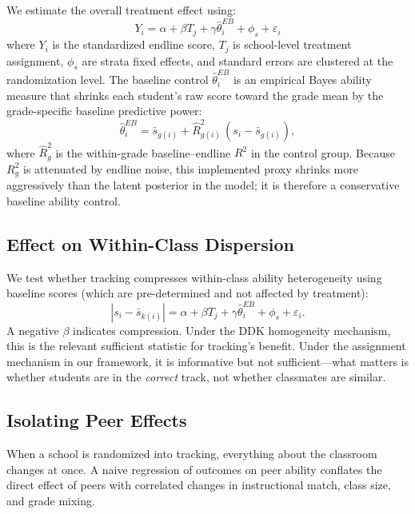 \documentclass[11pt]{article}
\begin{document}
We estimate the overall treatment effect using:
\begin{equation}
\label{eq:itt}
Y_i = \alpha + \beta T_j + \gamma \hat{\theta}^{EB}_i + \phi_s + \varepsilon_i
\end{equation}
where $Y_i$ is the standardized endline score, $T_j$ is school-level treatment assignment, $\phi_s$ are strata fixed effects, and standard errors are clustered at the randomization level. The baseline control $\hat{\theta}^{EB}_i$ is an empirical Bayes ability measure that shrinks each student's raw score toward the grade mean by the grade-specific baseline predictive power:
\begin{equation}
\label{eq:eb}
\hat{\theta}^{EB}_{i} = \bar{s}_{g(i)} + \widehat{R}^2_{g(i)}\,(s_i - \bar{s}_{g(i)}),
\end{equation}
where $\widehat{R}^2_g$ is the within-grade baseline--endline $R^2$ in the control group. Because $R^2_g$ is attenuated by endline noise, this implemented proxy shrinks more aggressively than the latent posterior in the model; it is therefore a conservative baseline ability control.

\subsection{Effect on Within-Class Dispersion}

We test whether tracking compresses within-class ability heterogeneity using baseline scores (which are pre-determined and not affected by treatment):
\begin{equation}
|s_i - \bar{s}_{k(i)}| = \alpha + \beta T_j + \gamma \hat{\theta}^{EB}_i + \phi_s + \varepsilon_i.
\end{equation}
A negative $\beta$ indicates compression. Under the DDK homogeneity mechanism, this is the relevant sufficient statistic for tracking's benefit. Under the assignment mechanism in our framework, it is informative but not sufficient---what matters is whether students are in the \emph{correct} track, not whether classmates are similar.

\subsection{Isolating Peer Effects}
\label{sec:bh}

When a school is randomized into tracking, everything about the classroom changes at once. A naive regression of outcomes on peer ability conflates the direct effect of peers with correlated changes in instructional match, class size, and grade mixing.
\end{document}
